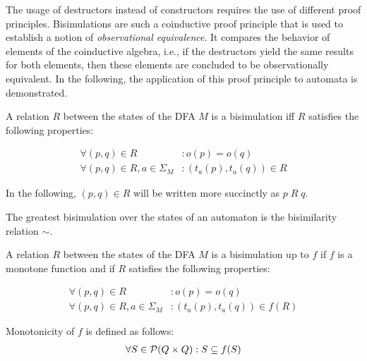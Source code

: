 The usage of destructors instead of constructors requires the use of different proof principles.
Bisimulations are such a coinductive proof principle that is used to establish
a notion of \textit{observational equivalence}.
It compares the behavior of elements of the coinductive algebra,
i.e., if the destructors yield the same results for both elements, then these elements are concluded
to be observationally equivalent.
In the following, the application of this proof principle to automata is demonstrated.

\begin{definition}
    A relation $R$ between the states of the DFA $M$ is a bisimulation
    iff $R$ satisfies the following properties:

    \begin{align}
        \forall (p, q) \in R&: o(p) = o(q) \\
        \forall (p, q) \in R, a \in \Sigma_M&: (t_a(p), t_a(q)) \in R
    \end{align}

    In the following, $(p, q) \in R$ will be written more succinctly as $p\;R\;q$.
\end{definition}

\begin{definition}
    The greatest bisimulation over the states of an automaton is the bisimilarity relation $\sim$.
\end{definition}

%
%

\begin{definition}
    A relation $R$ between the states of the DFA $M$ is a bisimulation up to $f$
    if $f$ is a monotone function and if $R$ satisfies the following properties:

    \begin{align}
        \forall (p, q) \in R&: o(p) = o(q) \\
        \forall (p, q) \in R, a \in \Sigma_M&: (t_a(p), t_a(q)) \in f(R)
    \end{align}

    Monotonicity of $f$ is defined as follows:
    \begin{align}
        \forall S \in \mathcal{P}(Q \times Q): S \subseteq f(S)
    \end{align}
\end{definition}

